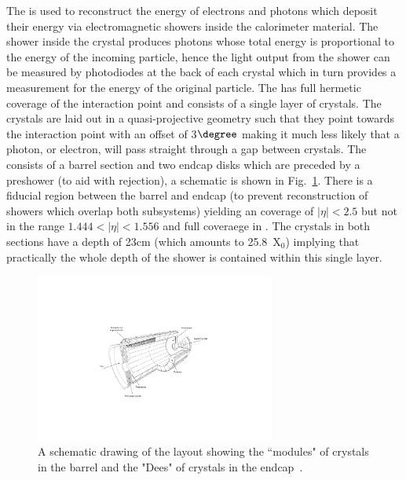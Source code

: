 The \ECAL is used to reconstruct the energy of electrons and photons which deposit their energy via electromagnetic showers inside the calorimeter material. The shower inside the crystal produces photons whose total energy is proportional to the energy of the incoming particle, hence the light output from the shower can be measured by photodiodes at the back of each crystal which in turn provides a measurement for the energy of the original particle. The \ECAL has full hermetic coverage of the interaction point and consists of a single layer of \PbWO crystals. The crystals are laid out in a quasi-projective geometry such that they point towards the interaction point with an offset of 3$\degree$ making it much less likely that a photon, or electron, will pass straight through a gap between crystals. The \ECAL consists of a barrel section and two endcap disks which are preceded by a preshower (to aid with \pizero rejection), a schematic is shown in Fig.~\ref{fig:cms_ecal}. There is a fiducial region between the barrel and endcap (to prevent reconstruction of showers which overlap both subsystems) yielding an \ECAL coverage of $|\eta|<2.5$ but not in the range $1.444<|\eta|<1.556$ and full coveraege in \phi. The crystals in both sections have a depth of 23cm (which amounts to 25.8~X$_{0}$) implying that practically the whole depth of the shower is contained within this single layer. 

\begin{figure}
  \includegraphics[width=0.7\textwidth]{cms_experiment/plots/cmsecal.pdf}
  \caption[CMS ECAL schematic]{A schematic drawing of the \CMS \ECAL layout showing the ``modules" of crystals in the \ECAL barrel and the "Dees" of crystals in the \ECAL endcap~\cite{CMS_JINST}.}
  \label{fig:cms_ecal}
\end{figure}

